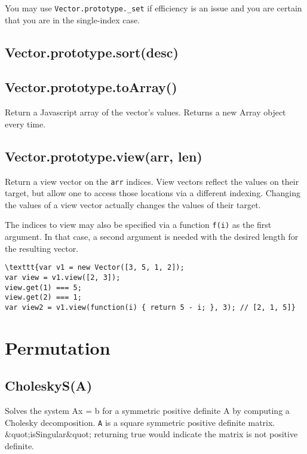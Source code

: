 \documentclass{article}
\begin{document}
You may use \texttt{Vector.prototype.\_set} if efficiency is an issue and you are certain that
you are in the single-index case.


    \subsection*{Vector.prototype.sort(desc)}
    
    \subsection*{Vector.prototype.toArray()}
    Return a Javascript array of the vector's values. Returns a new
Array object every time.


    \subsection*{Vector.prototype.view(arr, len)}
    Return a view vector on the \texttt{arr} indices. View vectors reflect the values on their
target, but allow one to access those locations via a different indexing.
Changing the values of a view vector actually changes the values of their target.


The indices to view may also be specified via a function \texttt{f(i)} as the first argument.
In that case, a second argument is needed with the desired length for the resulting vector.


\begin{lstlisting}
\texttt{var v1 = new Vector([3, 5, 1, 2]);
var view = v1.view([2, 3]);
view.get(1) === 5;
view.get(2) === 1;
var view2 = v1.view(function(i) { return 5 - i; }, 3); // [2, 1, 5]}\end{lstlisting}

  \section{Permutation}
    \subsection*{CholeskyS(A)}
    Solves the system Ax = b for a symmetric positive definite A by computing
a Cholesky decomposition. \texttt{A} is a square symmetric positive definite matrix.
\&quot;isSingular\&quot; returning true would indicate the matrix is not positive definite.
\end{document}
